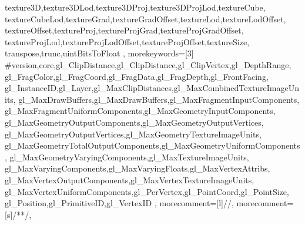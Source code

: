 {{		texture3D,texture3DLod,texture3DProj,texture3DProjLod,textureCube,
		textureCubeLod,textureGrad,textureGradOffset,textureLod,textureLodOffset,
		textureOffset,textureProj,textureProjGrad,textureProjGradOffset,
		textureProjLod,textureProjLodOffset,textureProjOffset,textureSize,
		transpose,trunc,uintBitsToFloat
	},
	morekeywords=[3]{
		\#version,core,gl_ClipDistance,gl_ClipDistance,gl_ClipVertex,gl_DepthRange,
		gl_FragColor,gl_FragCoord,gl_FragData,gl_FragDepth,gl_FrontFacing,
		gl_InstanceID,gl_Layer,gl_MaxClipDistances,gl_MaxCombinedTextureImageUnits,
		gl_MaxDrawBuffers,gl_MaxDrawBuffers,gl_MaxFragmentInputComponents,
		gl_MaxFragmentUniformComponents,gl_MaxGeometryInputComponents,
		gl_MaxGeometryOutputComponents,gl_MaxGeometryOutputVertices,
		gl_MaxGeometryOutputVertices,gl_MaxGeometryTextureImageUnits,
		gl_MaxGeometryTotalOutputComponents,gl_MaxGeometryUniformComponents,
		gl_MaxGeometryVaryingComponents,gl_MaxTextureImageUnits,
		gl_MaxVaryingComponents,gl_MaxVaryingFloats,gl_MaxVertexAttribs,
		gl_MaxVertexOutputComponents,gl_MaxVertexTextureImageUnits,
		gl_MaxVertexUniformComponents,gl_PerVertex,gl_PointCoord,gl_PointSize,
		gl_Position,gl_PrimitiveID,gl_VertexID
	},
	morecomment=[l]{//},
	morecomment=[s]{/*}{*/},
}


